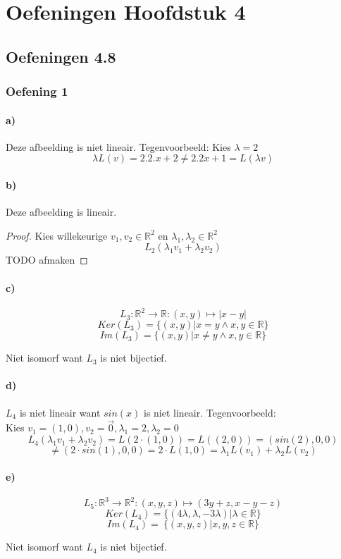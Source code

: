\documentclass[lineaire_algebra_oplossingen.tex]{subfiles}
\begin{document}
\chapter{Oefeningen Hoofdstuk 4}
\section{Oefeningen 4.8}
\subsection{Oefening 1}
\subsubsection*{a)}
Deze afbeelding is niet lineair. Tegenvoorbeeld: Kies $\lambda = 2$\\
\[
\lambda L(v) = 2 . 2 . x + 2 \neq 2 . 2 x + 1 = L(\lambda v)
\]

\subsubsection*{b)}
Deze afbeelding is lineair.
\begin{proof}
Kies willekeurige $v_1, v_2 \in \mathbb{R}^2$ en $\lambda_1, \lambda_2 \in \mathbb{R}^2$
\[
L_2(\lambda_1v_1 + \lambda_2v_2)
\]
TODO afmaken
\end{proof}

\subsubsection*{c)}
$$
L_3:\mathbb{R}^2\rightarrow\mathbb{R}:(x,y)\mapsto |x-y|
$$
$$
Ker(L_3)= \{(x,y)|x=y \wedge x,y \in \mathbb{R} \}
$$
$$
Im(L_3)= \{(x,y)|x\neq y \wedge x,y \in \mathbb{R} \}
$$
\begin{center}
Niet isomorf want $L_3$ is niet bijectief.
\end{center}

\subsubsection*{d)}
$L_4$ is niet lineair want $sin(x)$ is niet lineair.
Tegenvoorbeeld:\\
Kies $v_1=(1,0),v_2=\vec{0},\lambda_1 = 2,\lambda_2=0$
\[
L_4(\lambda_1v_1+\lambda_2v_2) = L(2\cdot(1,0))= L((2,0))=(sin(2),0,0)
\]
\[
\neq (2\cdot sin(1),0,0) = 2\cdot L(1,0) = \lambda_1L(v_1)+\lambda_2L(v_2)
\]

\subsubsection*{e)}
$$
L_5:\mathbb{R}^3\rightarrow\mathbb{R}^2:(x,y,z)\mapsto (3y+z,x-y-z)
$$
$$
Ker(L_4)= \{(4\lambda ,\lambda ,-3\lambda)|\lambda \in \mathbb{R} \}
$$
$$
Im(L_4)= \ \{(x ,y ,z)|x,y,z \in \mathbb{R} \}
$$
\begin{center}
Niet isomorf want $L_4$ is niet bijectief.
\end{center}
\end{document}
